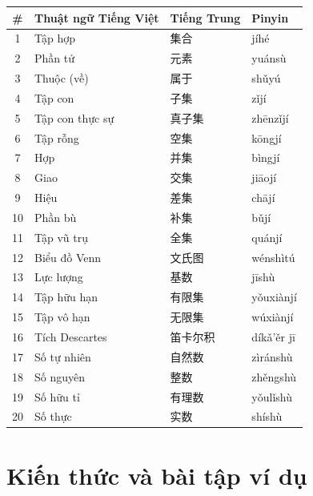 \documentclass[12pt, a4paper]{report}
\begin{document}
\begin{center}
\small
\begin{tabular}{@{}c l l l@{}}
  \toprule
  \textbf{\#} & \textbf{Thuật ngữ Tiếng Việt} & \textbf{Tiếng Trung} & \textbf{Pinyin} \\
  \midrule
  1  & Tập hợp            & 集合          & jíhé          \\
  2  & Phần tử            & 元素          & yuánsù        \\
  3  & Thuộc (về)         & 属于          & shǔyú         \\
  4  & Tập con            & 子集          & zǐjí          \\
  5  & Tập con thực sự    & 真子集        & zhēnzǐjí      \\
  6  & Tập rỗng           & 空集          & kōngjí        \\
  7  & Hợp                & 并集          & bìngjí        \\
  8  & Giao               & 交集          & jiāojí        \\
  9  & Hiệu               & 差集          & chājí         \\
  10 & Phần bù            & 补集          & bǔjí          \\
  11 & Tập vũ trụ         & 全集          & quánjí        \\
  12 & Biểu đồ Venn       & 文氏图        & wénshìtú      \\
  13 & Lực lượng          & 基数          & jīshù         \\
  14 & Tập hữu hạn        & 有限集        & yǒuxiànjí     \\
  15 & Tập vô hạn         & 无限集        & wúxiànjí      \\
  16 & Tích Descartes     & 笛卡尔积      & díkǎ'ěr jī    \\
  17 & Số tự nhiên        & 自然数        & zìránshù      \\
  18 & Số nguyên          & 整数          & zhěngshù      \\
  19 & Số hữu tỉ          & 有理数        & yǒulǐshù      \\
  20 & Số thực            & 实数          & shíshù        \\
  \bottomrule
\end{tabular}
\end{center}

\section{Kiến thức và bài tập ví dụ}
\end{document}
